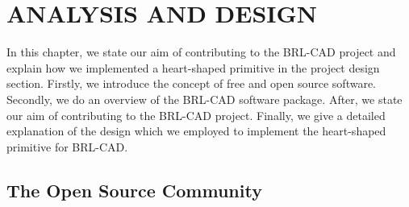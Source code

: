 
\chapter{ANALYSIS AND DESIGN} %

\label{Analysis And Design} %



\hspace{30} In this chapter,   we   state   our   aim   of   contributing   to   the   BRL-­CAD   project  
and   explain   how   we   implemented   a   heart-shaped   primitive   in   the   project   design  
section.   Firstly,   we   introduce   the   concept   of   free   and   open   source   software. Secondly,   we   do   an   overview   of   the   BRL-­CAD   software   package.   After,   we  state   our   aim   of   contributing   to   the   BRL-­CAD   project.   Finally,   we   give   a   detailed  explanation   of   the   design   which   we   employed   to   implement   the   heart-­shaped primitive for BRL-CAD.

\section{The Open Source Community}

